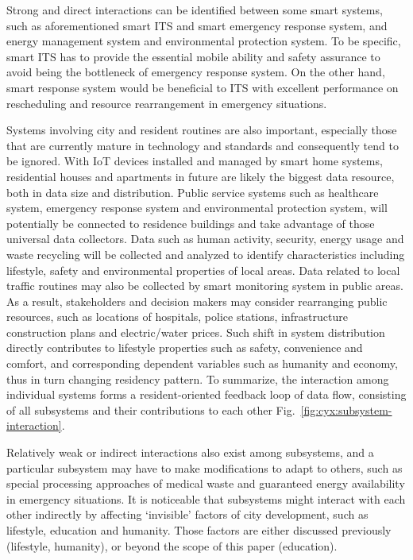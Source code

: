 \documentclass[letterpaper, twocolumn, 10pt, conference]{IEEEtran}
\begin{document}
Strong and direct interactions can be identified between some smart systems, such as aforementioned smart ITS and smart emergency response system, and energy management system and environmental protection system. To be specific, smart ITS has to provide the essential mobile ability and safety assurance to avoid being the bottleneck of emergency response system. On the other hand, smart response system would be beneficial to ITS with excellent performance on rescheduling and resource rearrangement in emergency situations.

Systems involving city and resident routines are also important, especially those that are currently mature in technology and standards and consequently tend to be ignored. With IoT devices installed and managed by smart home systems, residential houses and apartments in future are likely the biggest data resource, both in data size and distribution. Public service systems such as healthcare system, emergency response system and environmental protection system, will potentially be connected to residence buildings and take advantage of those universal data collectors. Data such as human activity, security, energy usage and waste recycling will be collected and analyzed to identify characteristics including lifestyle, safety and environmental properties of local areas. Data related to local traffic routines may also be collected by smart monitoring system in public areas. As a result, stakeholders and decision makers may consider rearranging public resources, such as locations of hospitals, police stations, infrastructure construction plans and electric/water prices. Such shift in system distribution directly contributes to lifestyle properties such as safety, convenience and comfort, and corresponding dependent variables such as humanity and economy, thus in turn changing residency pattern. To summarize, the interaction among individual systems forms a resident-oriented feedback loop of data flow, consisting of all subsystems and their contributions to each other Fig.~\ref{fig:cyx:subsystem-interaction}.

Relatively weak or indirect interactions also exist among subsystems, and a particular subsystem may have to make modifications to adapt to others, such as special processing approaches of medical waste and guaranteed energy availability in emergency situations. It is noticeable that subsystems might interact with each other indirectly by affecting ‘invisible’ factors of city development, such as lifestyle, education and humanity. Those factors are either discussed previously (lifestyle, humanity), or beyond the scope of this paper (education).
\end{document}

